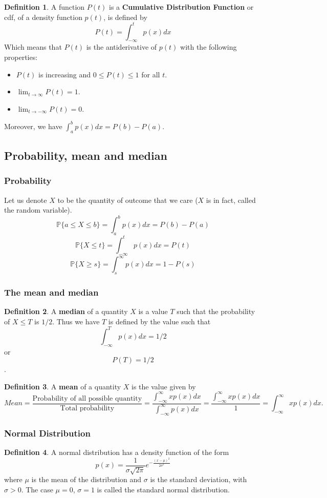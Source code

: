 \documentclass[12pt]{article}
\theoremstyle{definition}
\theoremstyle{definition}
\newtheorem{definition}{Definition}[section]
\theoremstyle{remark}
\theoremstyle{definition}
\theoremstyle{definition}
\theoremstyle{definition}
\begin{document}
\begin{definition}
A function $P(t)$ is a \textbf{Cumulative Distribution Function} or cdf, of a density function $p(t)$, is defined by 
\[P(t) =\int_{-\infty}^t p(x) dx \]
Which means that $P(t)$ is the antiderivative of $p(t)$ with the following properties:
\begin{itemize}
\item $P(t)$ is increasing and $0\leq P(t)\leq 1$ for all $t$.
\item $\lim_{t \to \infty}P(t)=1.$
\item $\lim_{t \to -\infty}P(t)=0.$
\end{itemize}
\end{definition}

Moreover, we have $\int_a^b p(x)dx=P(b)-P(a)$.

\subsection{Probability, mean and median}

\subsubsection*{Probability}
Let us denote $X$ to be the quantity of outcome that we care ($X$ is in fact, called the random variable).
\[\mathbb{P}\{a\leq X\leq b\}=\int_a^b p(x)dx=P(b)-P(a)\]
\[\mathbb{P}\{X\leq t\}=\int_{-\infty}^t p(x)dx=P(t)\]
\[\mathbb{P}\{X\geq s\}=\int_{s}^\infty p(x)dx=1-P(s)\]

\subsubsection*{The mean and median}
\begin{definition}
A \textbf{median} of a quantity $X$ is a value $T$ such that the probability of $X\leq T$ is $1/2$. Thus we have  $T$ is defined by the value such that
\[ \int_{-\infty}^T p(x) dx=1/2 \] or \[P(T)=1/2\].
\end{definition}
\begin{definition} A \textbf{mean} of a quantity $X$ is the value given by
	\[ Mean= \frac{\text{Probability of all possible quantity}}{\text{Total probability}}= \frac{\int_{-\infty}^{\infty}xp(x)dx}{\int_{-\infty}^{\infty}p(x)dx}=\frac{\int_{-\infty}^{\infty}xp(x)dx}{1}=\int_{-\infty}^{\infty}xp(x)dx. \]
\end{definition}

\subsubsection*{Normal Distribution}
\begin{definition}
A normal distribution has a density function of the form 
\[p(x)=\frac{1}{\sigma \sqrt{2 \pi}}e^{-\frac{(x-\mu)^2}{2\sigma^2}}\] where $\mu$ is the mean of the distribution and $\sigma$ is the standard deviation, with $\sigma > 0$.
The case $\mu = 0$, $\sigma = 1$ is called the standard normal distribution.

\end{definition}
\end{document}
